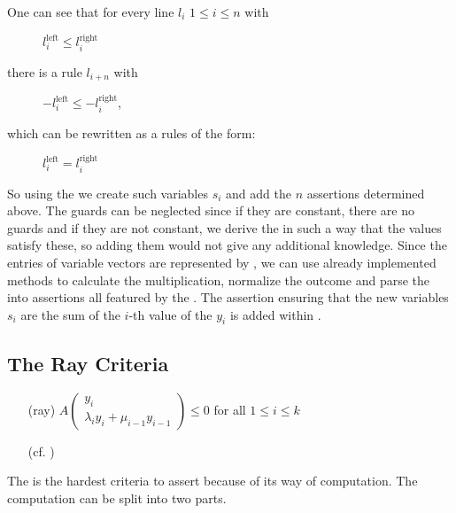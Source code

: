 One can see that for every line $l_i$ $1 \le i \le n$ with 
	\begin{figure}[H]
		\centering
		$l^{\text{left}}_i \le l^{\text{right}}_i$
	\end{figure} 
	there is a rule $l_{i+n}$ with 
	\begin{figure}[H]
		\centering
		$-l^{\text{left}}_i \le -l^{\text{right}}_i$,
	\end{figure}
	which can be rewritten as a rules of the form: 
	\begin{figure}[H]
		\centering
		$l^{\text{left}}_i = l^{\text{right}}_i$
	\end{figure}	
So using the \smtfactory we create such variables $s_i$ and add the $n$ assertions determined above. The guards can be neglected since if they are constant, there are no guards and if they are not constant, we derive the \stem in such a way that the values satisfy these, so adding them would not give any additional knowledge.\newline
Since the entries of variable vectors are represented by \rpntrees, we can use already implemented methods to calculate the multiplication, normalize the outcome and parse the \rpntrees into assertions all featured by the \smtfactory. \newline
The assertion ensuring that the new variables $s_i$ are the sum of the $i$-th value of the $y_i$ is added within .


\subsection{The Ray Criteria}
\label{sec:ray-criteria}
\begin{itemize}
	\setlength{\itemindent}{1in}
	\item[(ray)] $A\begin{pmatrix} y_i \\ \lambda_i y_i + \mu_{i-1} y_{i-1} \end{pmatrix} \le 0$ for all $1 \le i \le k$
	\item[] (cf. )
\end{itemize}
The \rayc is the hardest criteria to assert because of its way of computation. \newline
The computation can be split into two parts.
